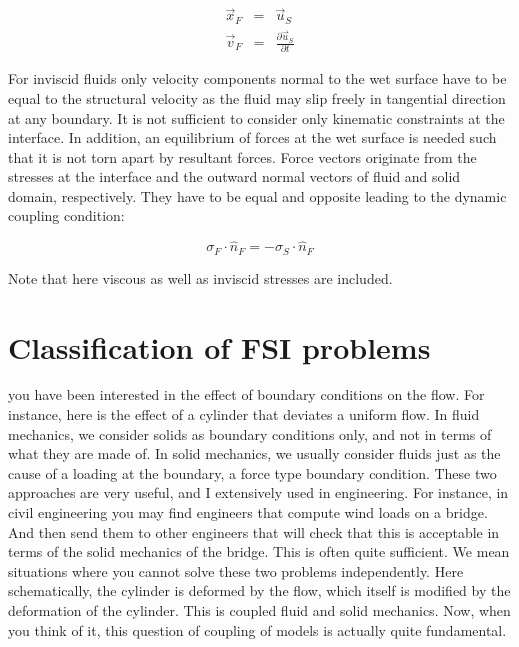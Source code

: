 \begin{eqnarray}
 \vec{x}_F &=& \vec{u}_S \\
 \vec{v}_F &=& \frac{\partial \vec{u}_S}{\partial t}
\end{eqnarray}

For inviscid fluids only velocity components normal to the wet surface have to be equal to the structural
velocity as the fluid may slip freely in tangential direction at any boundary.
It is not sufficient to consider only kinematic constraints at the interface. In addition, an equilibrium
of forces at the wet surface is needed such that it is not torn apart by resultant forces. Force vectors
originate from the stresses at the interface and the outward normal vectors of fluid and solid domain,
respectively. They have to be equal and opposite leading to the dynamic coupling condition:

\begin{equation}
\sigma_F \cdot \hat{n}_F = -\sigma_S \cdot \hat{n}_F
\end{equation}

Note that here viscous as well as inviscid stresses are included.

\section{Classification of FSI problems}
\label{sec:classification}
you have been interested in the effect of boundary conditions on the flow. For instance, here is the effect of a cylinder that deviates a uniform flow. In fluid mechanics, we consider solids as boundary conditions only,
and not in terms of what they are made of.
In solid mechanics, we usually consider fluids just as the cause of a loading at the boundary, a force type boundary condition. These two approaches are very useful, and I extensively used in engineering. For instance, in civil engineering you may find engineers that compute wind loads on a bridge. And then send them to other engineers that will check that this is acceptable in terms of the solid mechanics of the bridge. This is often quite sufficient.
We mean situations where you cannot solve these two problems independently.
Here schematically, the cylinder is deformed by the flow, which itself is modified by the deformation of the cylinder. This is coupled fluid and solid mechanics. Now, when you think of it, this question of coupling of models is actually quite fundamental.

